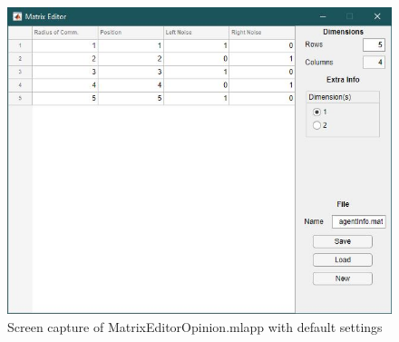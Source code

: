 \documentclass[../CourseManual.tex]{subfiles}
\begin{document}
\begin{figure}[H]
    \centering
    \includegraphics[width=350pt]{media/MatrixEditorOpinion.JPG}
    \caption{Screen capture of MatrixEditorOpinion.mlapp with default settings}
    \label{fig: matrix editor opinion}
\end{figure}
\end{document}

